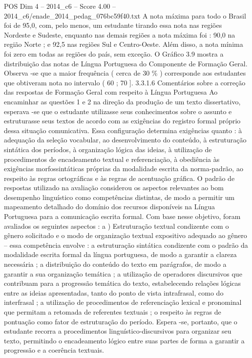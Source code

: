 \begin{textsample}{POS Dim 4 – 2014\_c6 – Score 4.00 – 2014\_c6/enade\_2014\_pedag\_076bc59f40.txt}
A nota máxima para todo o Brasil foi de 95,0, com, pelo menos, um estudante tirando essa nota nas regiões Nordeste e Sudeste, enquanto nas demais regiões a nota máxima foi : 90,0 na região Norte ; e 92,5 nas regiões Sul e Centro-Oeste.
Além disso, a nota mínima foi zero em todas as regiões do país, sem exceção.
O Gráfico 3.9 mostra a distribuição das notas de Língua Portuguesa do Componente de Formação Geral.
Observa -se que a maior frequência ( cerca de 30 \% ) corresponde aos estudantes que obtiveram nota no intervalo ( 60 ; 70 ]. 3.3.1.6 Comentários sobre a correção das respostas de Formação Geral com respeito à Língua Portuguesa Ao encaminhar as questões 1 e 2 na direção da produção de um texto dissertativo, esperava -se que o estudante utilizasse seus conhecimentos sobre o assunto e estruturasse seus textos de acordo com as exigências do registro formal próprio dessa situação comunicativa.
Essa configuração determina exigências quanto : à adequação da seleção vocabular, ao desenvolvimento do conteúdo, à estruturação sintática dos períodos, à organização lógica das ideias, à utilização de procedimentos de encadeamento textual e referenciação, à obediência às exigências morfossintáticas próprias da modalidade escrita da norma-padrão, ao respeito às regras ortográficas e às regras de acentuação gráfica.
O padrão de respostas utilizado na avaliação considerou os aspectos relevantes ao bom desempenho linguístico como competências distintas, de modo a permitir um mapeamento detalhado do domínio dos recursos disponíveis na Língua Portuguesa para a comunicação escrita formal.
Com base nesse objetivo, foram avaliados os seguintes aspectos : a ) Estruturação textual condizente com o gênero solicitado e o modo de organização textual expositivo adequado ao gênero – essa competência envolve : a estruturação sintática condizente com o padrão da modalidade escrita formal da língua portuguesa, de modo a garantir a clareza necessária ; a distribuição do conteúdo do texto em parágrafos, de modo a garantir a sua organização temática ; a utilização de operadores discursivos que contribuam para a progressão temática do texto, estabelecendo relações lógicas entre as ideias apresentadas, tanto do ponto de vista intrafrasal, como do interfrasal ; a utilização de procedimentos de referenciação lexical e pronominal que permitam a retomada de referentes textuais ; o respeito às regras de pontuação como fator de estruturação do período.
Espera -se, portanto, que o estudante recorra a procedimentos linguístico-discursivos para organizar seu texto, permitindo o encadeamento lógico entre suas partes de forma a garantir a progressão e a coerência textuais.

\end{textsample}
